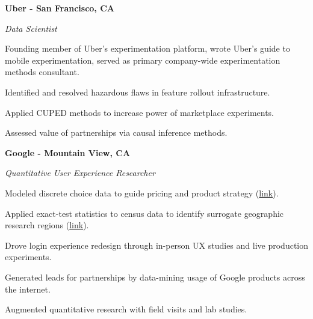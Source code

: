 \documentclass{res}
\begin{document}
{\begin{resume}
\begin{minipage}{7.6in}
\vspace{3mm}
\textbf{Uber - San Francisco, CA}

\vspace{0.75mm}
{\it Data Scientist}
\vspace{0.5mm}
\begin{list}{}{\leftmargin=1em}\itemsep-2pt
\item Founding member of Uber's experimentation platform, wrote Uber's guide to mobile experimentation, served as primary company-wide experimentation methods consultant.
\item Identified and resolved hazardous flaws in feature rollout infrastructure.
\item Applied CUPED methods to increase power of marketplace experiments.
\item Assessed value of partnerships via causal inference methods.
\end{list}

\vspace{3mm}
\textbf{Google - Mountain View, CA} 

\vspace{0.75mm}
{\it Quantitative User Experience Researcher}  
\vspace{0.5mm}
\begin{list}{}{\leftmargin=1em}\itemsep-2pt
\item Modeled discrete choice data to guide pricing and product strategy (\textcolor{blue}{\href{https://static.googleusercontent.com/media/research.google.com/en//pubs/archive/41381.pdf}{{link}}}).
\item Applied exact-test statistics to census data to identify surrogate geographic research regions (\textcolor{blue}{\href{http://steven.ae/ama_poster.pdf}{{link}}}).
\item Drove login experience redesign through in-person UX studies and live production experiments.%
\item Generated leads for partnerships by data-mining usage of Google products across the internet.
\item Augmented quantitative research with field visits and lab studies.
\end{list}



\end{minipage}
\end{resume}}
\end{document}
